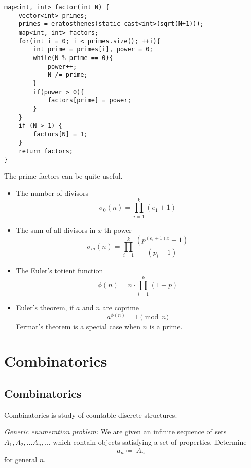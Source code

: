 \documentclass[12pt,t]{beamer}
\newcommand{\bi}{\begin{itemize}}
\newcommand{\ei}{\end{itemize}}
\begin{document}
\begin{frame}[fragile]
    \begin{verbatim}
map<int, int> factor(int N) {
    vector<int> primes;
    primes = eratosthenes(static_cast<int>(sqrt(N+1)));
    map<int, int> factors;
    for(int i = 0; i < primes.size(); ++i){
        int prime = primes[i], power = 0;
        while(N % prime == 0){
            power++;
            N /= prime;
        }
        if(power > 0){
            factors[prime] = power;
        }
    }
    if (N > 1) {
        factors[N] = 1;
    }
    return factors;
}
  \end{verbatim}
\end{frame}

\begin{frame}
  \vspace{20pt}
  The prime factors can be quite useful.
  \bi
    \item The number of divisors
    \[
      \sigma_0(n) = \prod_{i=1}^k (e_1 + 1)
    \]
    \item The sum of all divisors in $x$-th power
    \[
      \sigma_m(n) = \prod_{i=1}^k \frac{(p^{(e_i + 1)x} - 1)}{(p_i-1)}
    \]
  \ei
\end{frame}

\begin{frame}
  \vspace{20pt}
  \bi
    \item The Euler's totient function
      \[
        \phi(n) = n \cdot \prod_{i=1}^{k} (1 - p)
      \]
    \item Euler's theorem, if $a$ and $n$ are coprime
      \[
        a^{\phi(n)} = 1 \pmod{n}
      \]
      Fermat's theorem is a special case when $n$ is a prime.
  \ei
\end{frame}


\section{Combinatorics}
\subsection{Combinatorics}
\begin{frame}
  \vspace{40pt}
  Combinatorics is study of countable discrete structures.

  \vspace{10pt}
  \emph{Generic enumeration problem: } We are given an infinite sequence of
  sets $A_1, A_2, \ldots A_n, \ldots$ which contain objects satisfying a set of
  properties. Determine 
  \[
    a_n \coloneqq \lvert A_n \rvert
  \]
  for general $n$.
\end{frame}
\end{document}
